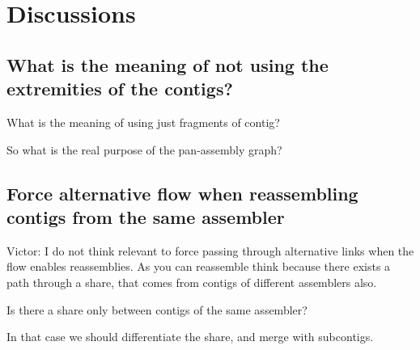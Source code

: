 \section{Discussions}

\subsection{What is the meaning of not using the extremities of the contigs?}

What is the meaning of using just fragments of contig?

So what is the real purpose of the pan-assembly graph?

\subsection{Force alternative flow when reassembling contigs from the same assembler}

Victor: I do not think relevant to force passing through alternative links when the flow enables reassemblies.
As you can reassemble think because there exists a path through a share, that comes from contigs of different assemblers also.

\begin{missingproofbox}
    Is there a share only between contigs of the same assembler?
\end{missingproofbox}

In that case we should differentiate the share, and merge with subcontigs.